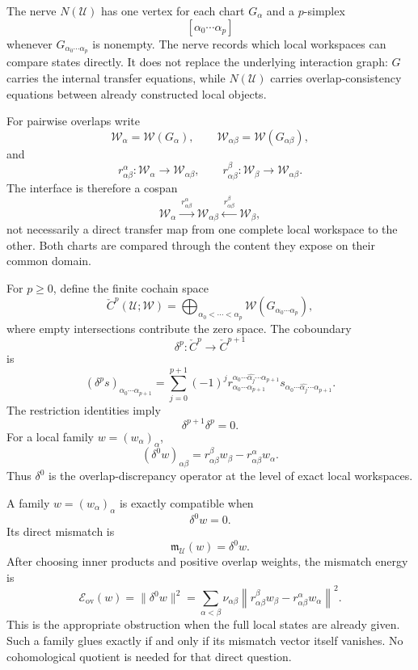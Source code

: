 
The nerve \(N(\mathcal U)\) has one vertex for each chart \(G_\alpha\) and a
\(p\)-simplex
\[
[\alpha_0\cdots\alpha_p]
\]
whenever \(G_{\alpha_0\cdots\alpha_p}\) is nonempty. The nerve records which
local workspaces can compare states directly. It does not replace the
underlying interaction graph: \(G\) carries the internal transfer equations,
while \(N(\mathcal U)\) carries overlap-consistency equations between already
constructed local objects.

For pairwise overlaps write
\[
\mathscr W_\alpha=\mathscr W(G_\alpha),
\qquad
\mathscr W_{\alpha\beta}=\mathscr W(G_{\alpha\beta}),
\]
and
\[
r_{\alpha\beta}^{\alpha}:
\mathscr W_\alpha\to\mathscr W_{\alpha\beta},
\qquad
r_{\alpha\beta}^{\beta}:
\mathscr W_\beta\to\mathscr W_{\alpha\beta}.
\]
The interface is therefore a cospan
\[
\mathscr W_\alpha
\xrightarrow{\ r_{\alpha\beta}^{\alpha}\ }
\mathscr W_{\alpha\beta}
\xleftarrow{\ r_{\alpha\beta}^{\beta}\ }
\mathscr W_\beta,
\]
not necessarily a direct transfer map from one complete local workspace to the
other. Both charts are compared through the content they expose on their
common domain.


For \(p\geq0\), define the finite cochain space
\[
\check C^p(\mathcal U;\mathscr W)
=
\bigoplus_{\alpha_0<\cdots<\alpha_p}
\mathscr W(G_{\alpha_0\cdots\alpha_p}),
\]
where empty intersections contribute the zero space. The coboundary
\[
\delta^p:\check C^p\longrightarrow\check C^{p+1}
\]
is
\[
\boxed{
(\delta^p s)_{\alpha_0\cdots\alpha_{p+1}}
=
\sum_{j=0}^{p+1}(-1)^j
r_{\alpha_0\cdots\alpha_{p+1}}^%
{\alpha_0\cdots\widehat{\alpha_j}\cdots\alpha_{p+1}}
%
s_{\alpha_0\cdots\widehat{\alpha_j}\cdots\alpha_{p+1}}.
}
\]
The restriction identities imply
\[
\delta^{p+1}\delta^p=0.
\]
For a local family \(w=(w_\alpha)_\alpha\),
\[
\boxed{
(\delta^0w)_{\alpha\beta}
=
r_{\alpha\beta}^{\beta}w_\beta
-
r_{\alpha\beta}^{\alpha}w_\alpha.
}
\]
Thus \(\delta^0\) is the overlap-discrepancy operator at the level of exact
local workspaces.



A family \(w=(w_\alpha)_\alpha\) is exactly compatible when
\[
\delta^0w=0.
\]
Its direct mismatch is
\[
\boxed{
\mathfrak m_{\mathcal U}(w)=\delta^0w.
}
\]
After choosing inner products and positive overlap weights, the mismatch
energy is
\[
\boxed{
\mathcal E_{\mathrm{ov}}(w)
=
\|\delta^0w\|^2
=
\sum_{\alpha<\beta}
\nu_{\alpha\beta}
\left\|
 r_{\alpha\beta}^{\beta}w_\beta
-r_{\alpha\beta}^{\alpha}w_\alpha
\right\|^2.
}
\]
This is the appropriate obstruction when the full local states are already
given. Such a family glues exactly if and only if its mismatch vector itself
vanishes. No cohomological quotient is needed for that direct question.

